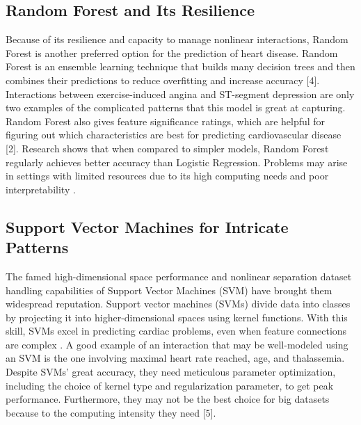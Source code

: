 \subsection{Random Forest and Its Resilience}
Because of its resilience and capacity to manage nonlinear interactions, Random Forest is another preferred option for the prediction of heart disease. Random Forest is an ensemble learning technique that builds many decision trees and then combines their predictions to reduce overfitting and increase accuracy [4]\cite{ren2017forest}. Interactions between exercise-induced angina and ST-segment depression are only two examples of the complicated patterns that this model is great at capturing. Random Forest also gives feature significance ratings, which are helpful for figuring out which characteristics are best for predicting cardiovascular disease [2]\cite{zhou2021machine}. Research shows that when compared to simpler models, Random Forest regularly achieves better accuracy than Logistic Regression. Problems may arise in settings with limited resources due to its high computing needs and poor interpretability \cite{soman2009machine}.

\subsection{Support Vector Machines for Intricate Patterns}
The famed high-dimensional space performance and nonlinear separation dataset handling capabilities of Support Vector Machines (SVM) have brought them widespread reputation. Support vector machines (SVMs) divide data into classes by projecting it into higher-dimensional spaces using kernel functions. With this skill, SVMs excel in predicting cardiac problems, even when feature connections are complex \cite{zhou2021machine}. A good example of an interaction that may be well-modeled using an SVM is the one involving maximal heart rate reached, age, and thalassemia. Despite SVMs' great accuracy, they need meticulous parameter optimization, including the choice of kernel type and regularization parameter, to get peak performance. Furthermore, they may not be the best choice for big datasets because to the computing intensity they need [5]\cite{soman2009machine}.

